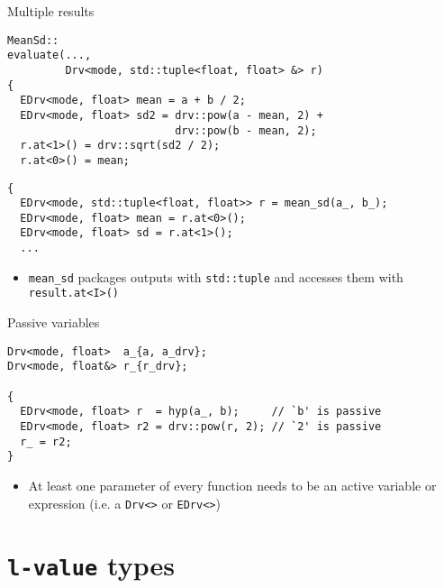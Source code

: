 \documentclass[xcolor=dvipsnames]{beamer}
\begin{document}
\begin{frame}[fragile]{Multiple results}
\begin{lstlisting}
MeanSd::
evaluate(...,
         Drv<mode, std::tuple<float, float> &> r)
{
  EDrv<mode, float> mean = a + b / 2;
  EDrv<mode, float> sd2 = drv::pow(a - mean, 2) +
                          drv::pow(b - mean, 2);
  r.at<1>() = drv::sqrt(sd2 / 2);
  r.at<0>() = mean;
\end{lstlisting}

\begin{lstlisting}
{
  EDrv<mode, std::tuple<float, float>> r = mean_sd(a_, b_);
  EDrv<mode, float> mean = r.at<0>();
  EDrv<mode, float> sd = r.at<1>();
  ...
\end{lstlisting}

\begin{itemize}
\item {\color{red}\texttt{mean\_sd}} packages outputs with \texttt{std::tuple} and accesses them with \texttt{result.at<I>()}
\end{itemize}
\end{frame}


\begin{frame}[fragile]{Passive variables}
\begin{lstlisting}
Drv<mode, float>  a_{a, a_drv};
Drv<mode, float&> r_{r_drv};

{
  EDrv<mode, float> r  = hyp(a_, b);     // `b' is passive
  EDrv<mode, float> r2 = drv::pow(r, 2); // `2' is passive
  r_ = r2;
}
\end{lstlisting}

\begin{itemize}
\item {At least one parameter of every function needs to be an active variable or expression (i.e. a \texttt{Drv<>} or \texttt{EDrv<>})}
\end{itemize}
\end{frame}


\section{\texttt{l-value} types}
\end{document}
